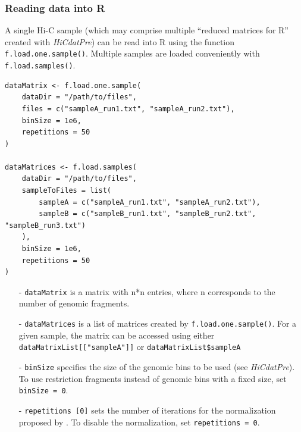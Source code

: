 \documentclass[a4paper,10pt]{article}
\begin{document}
\subsubsection{Reading data into R}
A single Hi-C sample (which may comprise multiple ``reduced matrices for R'' created with \textit{HiCdatPre}) can be read into R using the function \texttt{f.load.one.sample()}. Multiple samples are loaded conveniently with \texttt{f.load.samples()}. 
\begin{verbatim}
dataMatrix <- f.load.one.sample(
    dataDir = "/path/to/files",
    files = c("sampleA_run1.txt", "sampleA_run2.txt"),
    binSize = 1e6,
    repetitions = 50
)

dataMatrices <- f.load.samples(
    dataDir = "/path/to/files",
    sampleToFiles = list(
        sampleA = c("sampleA_run1.txt", "sampleA_run2.txt"), 
        sampleB = c("sampleB_run1.txt", "sampleB_run2.txt", "sampleB_run3.txt")
    ),
    binSize = 1e6,
    repetitions = 50
)
\end{verbatim}
\begin{itemize}
 \item[-] \texttt{dataMatrix} is a matrix with n*n entries, where n corresponds to the number of genomic fragments.
 \item[-] \texttt{dataMatrices} is a list of matrices created by \texttt{f.load.one.sample()}. For a given sample, the matrix can be accessed using either \texttt{dataMatrixList[["sampleA"]]} or \texttt{dataMatrixList\$sampleA}
 \item[-] \texttt{binSize} specifies the size of the genomic bins to be used (see \textit{HiCdatPre}). To use restriction fragments instead of genomic bins with a fixed size, set \texttt{binSize = 0}.
 \item[-] \texttt{repetitions [0]} sets the number of iterations for the normalization proposed by \cite{2012_Zhang}. To disable the normalization, set \texttt{repetitions = 0}.
\end{itemize}
\clearpage
\end{document}
